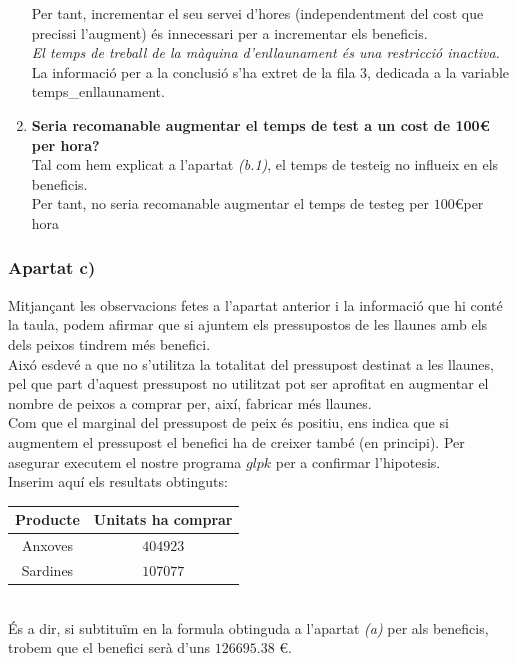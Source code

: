 \documentclass[a4paper, 11pt]{article}
\begin{document}
\begin{enumerate}
    Per tant, incrementar el seu servei d'hores (independentment del cost que precissi l'augment) és innecessari per a incrementar els beneficis.\\
    \textit{El temps de treball de la màquina d'enllaunament és una restricció inactiva.}\\
    La informació per a la conclusió s'ha extret de la fila 3, dedicada a la variable temps\_enllaunament.
    \item \textbf{Seria recomanable augmentar el temps de test a un cost de 100\euro \hspace{0.0625} per hora?}\\
    Tal com hem explicat a l'apartat \textit{(b.1)}, el temps de testeig no influeix en els beneficis.\\
    Per tant, no seria recomanable augmentar el temps de testeg per $100$\euro per hora
\end{enumerate}
\subsubsection{Apartat c)}
Mitjançant les observacions fetes a l'apartat anterior i la informació que hi conté la taula, podem afirmar que si ajuntem els pressupostos de les llaunes amb els dels peixos tindrem més benefici.\\
Aixó esdevé a que no s'utilitza la totalitat del pressupost destinat a les llaunes, pel que part d'aquest pressupost no utilitzat pot ser aprofitat en augmentar el nombre de peixos a comprar per, així, fabricar més llaunes.\\
Com que el marginal del pressupost de peix és positiu, ens indica que si augmentem el pressupost el benefici ha de creixer també (en principi).
Per asegurar executem el nostre programa $glpk$ per a confirmar l'hipotesis.\\
Inserim aquí els resultats obtinguts:
\begin{table}[h]
    \centering
    \begin{tabular}{c|c}
        \textbf{Producte} & \textbf{Unitats ha comprar} \\ \hline
        Anxoves & $404923$\\ \hline
        Sardines & $107077$\\ 
    \end{tabular}
\end{table}\\
És a dir, si subtituïm en la formula obtinguda a l'apartat \textit{(a)} per als beneficis, trobem que el benefici serà d'uns $126695.38$ \euro. 
\end{document}
